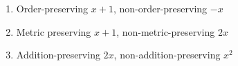 \begin{enumerate}
    \item{Order-preserving $x+1$, non-order-preserving $-x$}
    \item{Metric preserving $x+1$, non-metric-preserving $2x$}
    \item{Addition-preserving $2x$, non-addition-preserving $x^2$}
  \end{enumerate}
